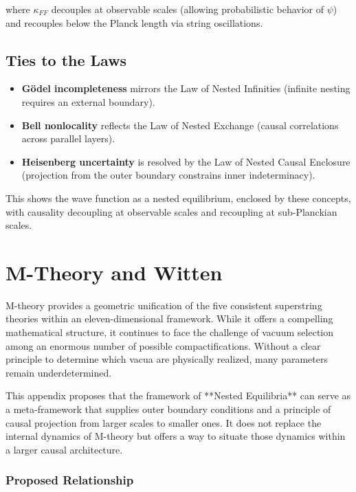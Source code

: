 where $\kappa_{FF}$ decouples at observable scales (allowing probabilistic behavior of $\psi$) and recouples below the Planck length via string oscillations.

\section{Ties to the Laws}

\begin{itemize}
    \item \textbf{Gödel incompleteness} mirrors the Law of Nested Infinities (infinite nesting requires an external boundary).
    \item \textbf{Bell nonlocality} reflects the Law of Nested Exchange (causal correlations across parallel layers).
    \item \textbf{Heisenberg uncertainty} is resolved by the Law of Nested Causal Enclosure (projection from the outer boundary constrains inner indeterminacy).
\end{itemize}

This shows the wave function as a nested equilibrium, enclosed by these concepts, with causality decoupling at observable scales and recoupling at sub-Planckian scales.

\chapter{M-Theory and Witten}

M-theory provides a geometric unification of the five consistent superstring theories within an eleven-dimensional framework. While it offers a compelling mathematical structure, it continues to face the challenge of vacuum selection among an enormous number of possible compactifications. Without a clear principle to determine which vacua are physically realized, many parameters remain underdetermined.

This appendix proposes that the framework of **Nested Equilibria** can serve as a meta-framework that supplies outer boundary conditions and a principle of causal projection from larger scales to smaller ones. It does not replace the internal dynamics of M-theory but offers a way to situate those dynamics within a larger causal architecture.

\subsection{Proposed Relationship}

